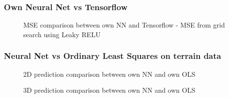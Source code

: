 \documentclass
[twocolumn,
secnumarabic,
nobibnotes,
aps,
prl,
reprint,
groupedaddress,
amsmath,
amssymb
]{revtex4-2}
\begin{document}
\subsubsection{Own Neural Net vs Tensorflow}
\begin{figure}
  \hspace*{-1.5cm}
  \caption{MSE comparison between own NN and Tensorflow - MSE from grid search using Leaky RELU\label{fig:own_NN_vs_tf}}
\end{figure}

\subsubsection{Neural Net vs Ordinary Least Squares on terrain data}

\begin{figure}
  \caption{2D prediction comparison between own NN and own OLS \label{fig:2D_preds_NN_vs_OLS}}
\end{figure}

\begin{figure}
  \caption{3D prediction comparison between own NN and own OLS \label{fig:3D_preds_NN_vs_OLS}}
\end{figure}
\end{document}

